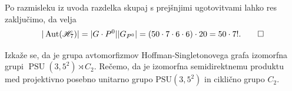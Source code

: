 \documentclass[fin1, tisk]{fmfdelo}
\newcommand{\hof}{\mathscr{H}_{7}}
\newcommand{\GF}{\mathrm{GF}}
\newcommand{\aut}{\operatorname{Aut}}
\begin{document}
\begin{dokaz}
Po razmisleku iz uvoda razdelka skupaj s prejšnjimi ugo\-to\-vit\-va\-mi lahko res zaključimo, da velja
 \[|\aut(\hof)| = |G\cdot P^0||G_{P^0}| = (50\cdot 7\cdot 6\cdot 6) \cdot 20 = 50 \cdot 7!.\qedhere\]
\end{dokaz}




\begin{opomba}
    Izkaže se, da je grupa avtomorfizmov Hoffman-Singletonovega grafa
    izomorfna grupi $\operatorname{PSU}(3, 5^2) \rtimes C_2$. Rečemo, da je
    izomorfna semidirektnemu produktu med projektivno posebno unitarno
    grupo $\text{PSU}(3, 5^2)$ in ciklično grupo $C_2$.
\end{opomba}

\end{document}

